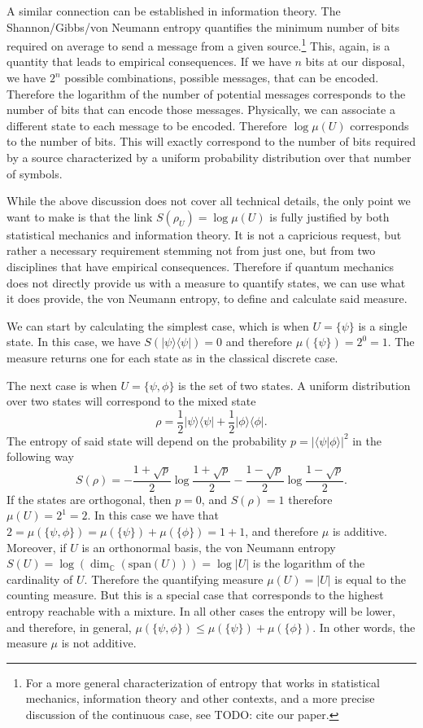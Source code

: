 \documentclass[10pt,twocolumn, nofootinbib]{revtex4-2}
\def\>{\rangle}
\def\<{\langle}
\begin{document}
A similar connection can be established in information theory. The Shannon/Gibbs/von Neumann entropy quantifies the minimum number of bits required on average to send a message from a given source.\footnote{For a more general characterization of entropy that works in statistical mechanics, information theory and other contexts, and a more precise discussion of the continuous case, see TODO: cite our paper.} This, again, is a quantity that leads to empirical consequences. If we have $n$ bits at our disposal, we have $2^n$ possible combinations, possible messages, that can be encoded. Therefore the logarithm of the number of potential messages corresponds to the number of bits that can encode those messages. Physically, we can associate a different state to each message to be encoded. Therefore $\log \mu(U)$ corresponds to the number of bits. This will exactly correspond to the number of bits required by a source characterized by a uniform probability distribution over that number of symbols.

While the above discussion does not cover all technical details, the only point we want to make is that the link $S(\rho_U) = \log \mu(U)$ is fully justified by both statistical mechanics and information theory. It is not a capricious request, but rather a necessary requirement stemming not from just one, but from two disciplines that have empirical consequences. Therefore if quantum mechanics does not directly provide us with a measure to quantify states, we can use what it does provide, the von Neumann entropy, to define and calculate said measure.

We can start by calculating the simplest case, which is when $U = \{ \psi \}$ is a single state. In this case, we have $S(|\psi\>\<\psi|) = 0$ and therefore $\mu(\{\psi\}) = 2^{0} = 1$. The measure returns one for each state as in the classical discrete case.

The next case is when $U = \{ \psi, \phi \}$ is the set of two states. A uniform distribution over two states will correspond to the mixed state
\begin{equation}
	\rho = \frac{1}{2} |\psi\>\<\psi| + \frac{1}{2} |\phi\>\<\phi|.
\end{equation}
The entropy of said state will depend on the probability $p=|\<\psi | \phi \>|^2$ in the following way
\begin{equation}
	S(\rho) = - \frac{1+\sqrt{p}}{2} \log \frac{1+\sqrt{p}}{2} 
	- \frac{1-\sqrt{p}}{2} \log \frac{1-\sqrt{p}}{2}.
\end{equation}
If the states are orthogonal, then $p=0$, and $S(\rho) = 1$ therefore $\mu(U) = 2^1 = 2$. In this case we have that $2 = \mu(\{ \psi, \phi \}) = \mu(\{\psi\}) + \mu(\{\phi\}) = 1 + 1$, and therefore $\mu$ is additive. Moreover, if $U$ is an orthonormal basis, the von Neumann entropy $S(U) = \log(\dim_{\mathbb{C}}(\text{span}(U))) = \log |U|$ is the logarithm of the cardinality of $U$. Therefore the quantifying measure $\mu(U) = |U|$ is equal to the counting measure. But this is a special case that corresponds to the highest entropy reachable with a mixture. In all other cases the entropy will be lower, and therefore, in general, $\mu(\{ \psi, \phi \}) \leq \mu(\{\psi\}) + \mu(\{\phi\})$. In other words, the measure $\mu$ is not additive.
\end{document}
